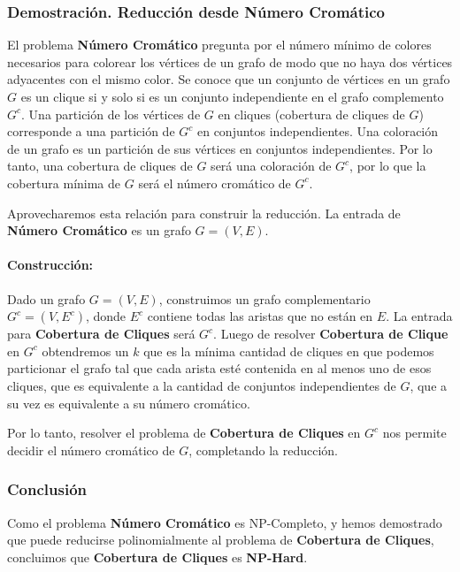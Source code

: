 \documentclass[a4paper,12pt]{article}
\begin{document}
\subsubsection{Demostraci\'on. Reducci\'on desde N\'umero Crom\'atico}
El problema \textbf{N\'umero Crom\'atico} pregunta por el n\'umero m\'inimo de colores necesarios para colorear los v\'ertices de un grafo de modo que no haya dos v\'ertices adyacentes con el mismo color. 
Se conoce que un conjunto de vértices en un grafo $G$ es un clique si y solo si es un conjunto independiente en el grafo complemento $G^c$. Una partición de los vértices de $G$ en cliques
(cobertura de cliques de $G$) corresponde a una partición de $G^c$ en conjuntos independientes. Una coloración de un grafo es un partición de sus vértices en conjuntos independientes. Por lo tanto, una cobertura de cliques de $G$ 
será una coloración de $G^c$, por lo que la cobertura mínima de $G$ será el número cromático de $G^c$.

Aprovecharemos esta relaci\'on para construir la reducci\'on. La entrada de \textbf{N\'umero Crom\'atico} es un grafo $G = (V, E)$.



\paragraph{Construcci\'on:} Dado un grafo $G = (V, E)$, construimos un grafo complementario $G^c = (V, E^c)$, donde $E^c$ contiene todas las aristas que no est\'an en $E$. La entrada para \textbf{Cobertura de Cliques} ser\'a $G^c$.
Luego de resolver \textbf{Cobertura de Clique} en $G^c$ obtendremos un $k$ que es la mínima cantidad de cliques en que podemos particionar el grafo tal que cada arista esté contenida en al menos uno de esos cliques, que es equivalente a la cantidad de conjuntos independientes de $G$, que a su vez es equivalente a su número cromático.


Por lo tanto, resolver el problema de \textbf{Cobertura de Cliques} en $G^c$ nos permite decidir el n\'umero crom\'atico de $G$, completando la reducci\'on.

\subsubsection{Conclusi\'on}
Como el problema \textbf{N\'umero Crom\'atico} es NP-Completo, y hemos demostrado que puede reducirse polinomialmente al problema de \textbf{Cobertura de Cliques}, concluimos que \textbf{Cobertura de Cliques} es \textbf{NP-Hard}.
\end{document}
